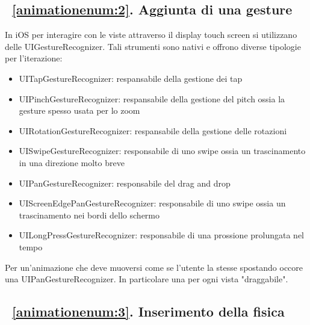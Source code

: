 \subsection{~\ref{animationenum:2}. Aggiunta di una gesture}

In iOS per interagire con le viste attraverso il display touch screen si utilizzano delle UIGestureRecognizer.
Tali strumenti sono nativi e offrono diverse tipologie per l'iterazione:
\begin{itemize}
    \item UITapGestureRecognizer: respansabile della gestione dei tap

    \item UIPinchGestureRecognizer: respansabile della gestione del pitch ossia la gesture spesso usata per lo zoom
    
    \item UIRotationGestureRecognizer: respansabile della gestione delle rotazioni
    
    \item UISwipeGestureRecognizer: responsabile di uno swipe ossia un trascinamento in una direzione molto breve
    
    \item UIPanGestureRecognizer: responsabile del drag and drop
    
    \item UIScreenEdgePanGestureRecognizer: responsabile di uno swipe ossia un trascinamento nei bordi dello schermo
    
    \item UILongPressGestureRecognizer: responsabile di una prossione prolungata nel tempo
\end{itemize}

Per un'animazione che deve muoversi come se l'utente la stesse spostando occore una UIPanGestureRecognizer.
In particolare una per ogni vista "draggabile".

\subsection{~\ref{animationenum:3}. Inserimento della fisica}

